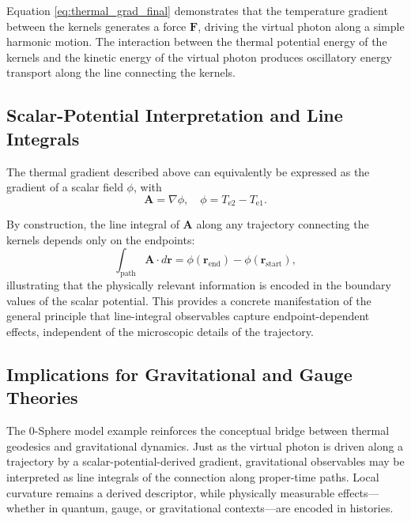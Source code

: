 \documentclass[%
 reprint,
 amsmath,amssymb,
 aps,
 prb,
]{revtex4-2}
\numberwithin{equation}{section}
\begin{document}
Equation \eqref{eq:thermal_grad_final} demonstrates that the temperature gradient between the kernels generates a force $\mathbf{F}$, driving the virtual photon along a simple harmonic motion. The interaction between the thermal potential energy of the kernels and the kinetic energy of the virtual photon produces oscillatory energy transport along the line connecting the kernels.

\subsection{Scalar-Potential Interpretation and Line Integrals}
\label{sec:scalar_potential_line_integral}

The thermal gradient described above can equivalently be expressed as the gradient of a scalar field $\phi$, with
\begin{equation}
\mathbf{A} = \nabla \phi, \quad \phi = T_{\mathrm{e2}} - T_{\mathrm{e1}}.
\end{equation}

By construction, the line integral of $\mathbf{A}$ along any trajectory connecting the kernels depends only on the endpoints:
\begin{equation}
\int_\mathrm{path} \mathbf{A} \cdot d\mathbf{r} = \phi(\mathbf{r}_\mathrm{end}) - \phi(\mathbf{r}_\mathrm{start}),
\end{equation}
illustrating that the physically relevant information is encoded in the boundary values of the scalar potential. This provides a concrete manifestation of the general principle that line-integral observables capture endpoint-dependent effects, independent of the microscopic details of the trajectory.

\subsection{Implications for Gravitational and Gauge Theories}
\label{sec:implications_gravity_gauge}

The 0-Sphere model example reinforces the conceptual bridge between thermal geodesics and gravitational dynamics. Just as the virtual photon is driven along a trajectory by a scalar-potential-derived gradient, gravitational observables may be interpreted as line integrals of the connection along proper-time paths. Local curvature remains a derived descriptor, while physically measurable effects—whether in quantum, gauge, or gravitational contexts—are encoded in histories.
\end{document}
